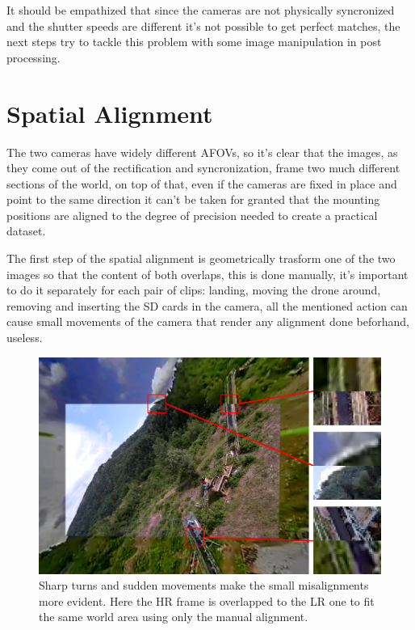 It should be empathized that since the cameras are not physically syncronized and the shutter speeds are different it's not possible to get perfect matches, the next steps try to tackle this problem with some image manipulation in post processing.

\section{Spatial Alignment}
\label{sec:spatial_align}

The two cameras have widely different AFOVs, so it's clear that the images, as they come out of the rectification and syncronization, frame two much different sections of the world, on top of that, even if the cameras are fixed in place and point to the same direction it can't be taken for granted that the mounting positions are aligned to the degree of precision needed to create a practical dataset.

The first step of the spatial alignment is geometrically trasform one of the two images so that the content of both overlaps, this is done manually, it's important to do it separately for each pair of clips: landing, moving the drone around, removing and inserting the SD cards in the camera, all the mentioned action can cause small movements of the camera that render any alignment done beforhand, useless.

\begin{figure}[H]
  \centering
  \includegraphics[scale=1.5]{figures/HR_on_LR_M_err_highlight.png}
  \caption{Sharp turns and sudden movements make the small misalignments more evident. Here the HR frame is overlapped to the LR one to fit the same world area using only the manual alignment.}
  \label{img:align_err}
\end{figure}

